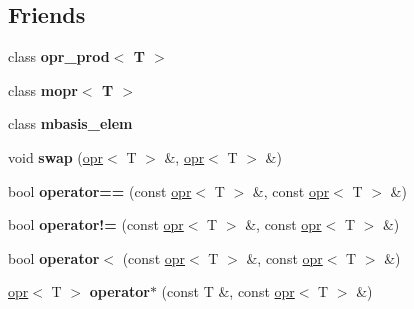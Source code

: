 \subsection*{Friends}
\begin{DoxyCompactItemize}
\item 
\mbox{\label{classqbasis_1_1opr_abf2c36ac99bcc8a5c91383636a4d518b}} 
class {\bfseries opr\+\_\+prod$<$ T $>$}
\item 
\mbox{\label{classqbasis_1_1opr_aea2ca45ecf8a45b45ff4f4d7c7c733bc}} 
class {\bfseries mopr$<$ T $>$}
\item 
\mbox{\label{classqbasis_1_1opr_a3be8150c21a3b566fdd22a8051fad117}} 
class {\bfseries mbasis\+\_\+elem}
\item 
\mbox{\label{classqbasis_1_1opr_aa1feb5cb66985f50d030c573d88c14a2}} 
void {\bfseries swap} (\hyperlink{classqbasis_1_1opr}{opr}$<$ T $>$ \&, \hyperlink{classqbasis_1_1opr}{opr}$<$ T $>$ \&)
\item 
\mbox{\label{classqbasis_1_1opr_a9fc4abdb6929a8c416267c72379af7ec}} 
bool {\bfseries operator==} (const \hyperlink{classqbasis_1_1opr}{opr}$<$ T $>$ \&, const \hyperlink{classqbasis_1_1opr}{opr}$<$ T $>$ \&)
\item 
\mbox{\label{classqbasis_1_1opr_a7dd7042319c6ab1cb60e2104c006b089}} 
bool {\bfseries operator!=} (const \hyperlink{classqbasis_1_1opr}{opr}$<$ T $>$ \&, const \hyperlink{classqbasis_1_1opr}{opr}$<$ T $>$ \&)
\item 
\mbox{\label{classqbasis_1_1opr_aace3b0904e46792fe66d98e8de49a58d}} 
bool {\bfseries operator$<$} (const \hyperlink{classqbasis_1_1opr}{opr}$<$ T $>$ \&, const \hyperlink{classqbasis_1_1opr}{opr}$<$ T $>$ \&)
\item 
\mbox{\label{classqbasis_1_1opr_a011efc37698648f27e951f51a7325671}} 
\hyperlink{classqbasis_1_1opr}{opr}$<$ T $>$ {\bfseries operator$\ast$} (const T \&, const \hyperlink{classqbasis_1_1opr}{opr}$<$ T $>$ \&)
\item 
\mbox{\label{classqbasis_1_1opr_a0dcb17f782ff089a6d1d3c019030ea25}} 

\end{DoxyCompactItemize}
